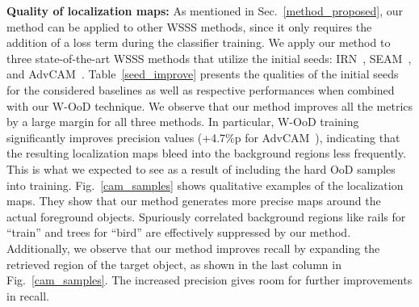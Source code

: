 \documentclass[10pt,twocolumn,letterpaper]{article}
\begin{document}
\textbf{Quality of localization maps:}
As mentioned in Sec.~\ref{method_proposed}, our method can be applied to other WSSS methods, since it only requires the addition of a loss term  during the classifier training.
We apply our method to three state-of-the-art WSSS methods that utilize the initial seeds: IRN~\cite{ahn2019weakly}, SEAM~\cite{wang2020self}, and AdvCAM~\cite{lee2021anti}.
Table~\ref{seed_improve} presents the qualities of the initial seeds for the considered baselines as well as respective performances when combined with our W-OoD technique. We observe that our method improves all the metrics by a large margin for all three methods. 
In particular, W-OoD training significantly improves precision values (\eg +4.7\%p for AdvCAM~\cite{lee2021anti}), indicating that the resulting localization maps bleed into the background regions less frequently. This is what we expected to see as a result of including the hard OoD samples into training.
Fig.~\ref{cam_samples} shows qualitative examples of the localization maps. 
They show that our method generates more precise maps around the actual foreground objects. Spuriously correlated background regions like rails for ``train'' and trees for ``bird'' are effectively suppressed by our method.
Additionally, we observe that our method improves recall by expanding the retrieved region of the target object, as shown in the last column in Fig.~\ref{cam_samples}. 
The increased precision gives room for further improvements in recall.
\end{document}
